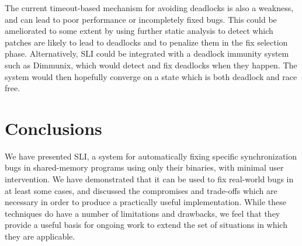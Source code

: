 \documentclass[10pt,twocolumn,preprint,natbib,authoryear]{sigplanconf}
\newcommand{\editorial}[1]{}
\begin{document}
The current timeout-based mechanism for avoiding deadlocks is also a
weakness, and can lead to poor performance or incompletely fixed bugs.
This could be ameliorated to some extent by using further static
analysis to detect which patches are likely to lead to deadlocks and
to penalize them in the fix selection phase.  Alternatively, SLI could
be integrated with a deadlock immunity system such as
Dimmunix\cite{Jula2008}, which would detect and fix deadlocks when
they happen.  The system would then hopefully converge on a state
which is both deadlock and race free.

\section{Conclusions}

We have presented SLI, a system for automatically fixing specific
synchronization bugs in shared-memory programs using only their
binaries, with minimal user intervention.  We have demonstrated that
it can be used to fix real-world bugs in at least some cases, and
discussed the compromises and trade-offs which are necessary in order
to produce a practically useful implementation.  While these
techniques do have a number of limitations and drawbacks, we feel that
they provide a useful basis for ongoing work to extend the set of
situations in which they are applicable.\editorial{Wibble wibble
  wibble}




\end{document}
